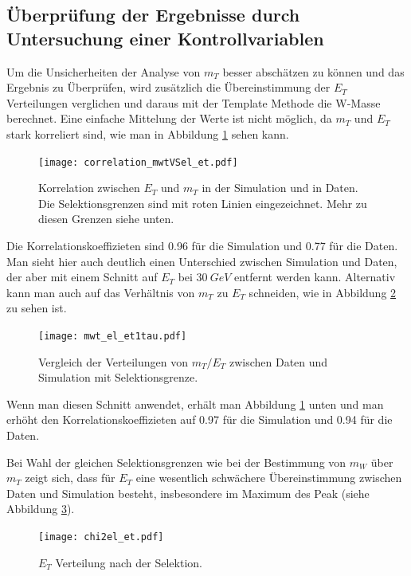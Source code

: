 \documentclass[a4paper,12pt]{article}
\begin{document}
\subsection{Überprüfung der Ergebnisse durch Untersuchung einer Kontrollvariablen}
Um die Unsicherheiten der Analyse von $m_{T}$ besser abschätzen zu können und das Ergebnis zu Überprüfen, wird zusätzlich
die Übereinstimmung der $E_T$ Verteilungen verglichen und daraus mit der Template Methode die W-Masse
berechnet. Eine einfache Mittelung der Werte ist nicht möglich, da $m_T$ und $E_T$ stark korreliert
sind, wie man in Abbildung \ref{fig:correlation} sehen kann.
\begin{figure}[htb]
	\centering
	\texttt{[image: correlation\_mwtVSel\_et.pdf]}\\
	\caption{Korrelation zwischen $E_T$ und $m_T$ in der Simulation und in Daten. Die
		Selektionsgrenzen sind mit roten Linien eingezeichnet. Mehr zu diesen Grenzen siehe
	unten.}
	\label{fig:correlation}
\end{figure}

Die Korrelationskoeffizieten sind 0.96 für die Simulation und 0.77 für die Daten. Man sieht hier
auch deutlich einen Unterschied  zwischen Simulation und Daten, der aber mit einem Schnitt auf $E_T$ bei
$\SI{30}{GeV}$ entfernt werden kann. Alternativ kann man auch auf das Verhältnis von $m_T$ zu $E_T$
schneiden, wie in Abbildung \ref{fig:verhaeltnis} zu sehen ist.

\begin{figure}[htb]
	\centering
	\texttt{[image: mwt\_el\_et1tau.pdf]}
	\caption{Vergleich der Verteilungen von $m_T/E_T$ zwischen Daten und Simulation mit
	Selektionsgrenze.}
	\label{fig:verhaeltnis}
\end{figure}

Wenn man diesen Schnitt anwendet, erhält man Abbildung \ref{fig:correlation} unten und man
erhöht den Korrelationskoeffizieten auf 0.97 für die Simulation und 0.94 für die Daten.

Bei Wahl der gleichen Selektionsgrenzen wie bei der Bestimmung von $m_{W}$ über $m_T$ zeigt sich, dass 
für $E_{T}$ eine wesentlich schwächere Übereinstimmung zwischen Daten und Simulation besteht, insbesondere
im Maximum des Peak (siehe Abbildung \ref{fig:etaftercut}).
\begin{figure}[htb]
	\centering
	\texttt{[image: chi2el\_et.pdf]}
	\caption{$E_{T}$ Verteilung nach der Selektion. }
	\label{fig:etaftercut}
\end{figure}
\end{document}
